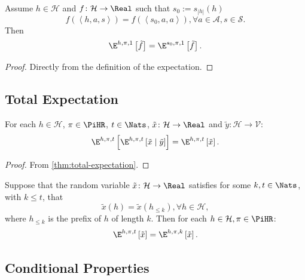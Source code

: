\begin{theorem} \label{thm:exph-horizon-trim}
Assume $h \in \mathcal{H}$ and $f \colon \mathcal{H} \to \Real$ such that $s_0 := s_{|h|}(h)$
\[
f(\left< h, a, s \right>) = f(\left< s_0, a, a \right>) , \forall a\in \mathcal{A}, s\in \mathcal{S}.
\]
Then
\[
\E^{h,\pi,1}\left[ \tilde{f} \right] =   
\E^{s_0,\pi,1}\left[ \tilde{f} \right].
\]
\end{theorem}
\begin{proof}
  Directly from the definition of the expectation.
\end{proof}

\subsection{Total Expectation}

\begin{theorem} \label{thm:total-expectation-h}
  For each $h\in \mathcal{H}$, $\pi\in \PiHR$, $t\in \Nats$, $\tilde{x}\colon \mathcal{H} \to \Real$ and $\tilde{y}\colon \mathcal{H} \to \mathcal{V}$:
  \[
    \E^{h, \pi, t} \left[ \E^{h, \pi, t} \left[  \tilde{x} \mid  \tilde{y} \right] \right]
    =
    \E^{h, \pi, t} \left[ \tilde{x} \right].
  \]
\end{theorem}
\begin{proof}
From \cref{thm:total-expectation}.
\end{proof}

\begin{theorem}\label{thm:exp-horizon-cut}
Suppose that the random variable $\tilde{x}\colon \mathcal{H} \to \Real$ satisfies for some $k, t \in \Nats$, with $k \le t$, that
  \[
   \tilde{x}(h) = \tilde{x}(h_{\le k}) , \forall h\in  \mathcal{H},
 \]
 where $h_{\le k}$ is the prefix of $h$ of length $k$. Then for each $h\in \mathcal{H}, \pi\in \PiHR$:
 \[
  \E^{h,\pi,t} \left[ \tilde{x} \right]  = \E^{h,\pi,k} \left[  \tilde{x} \right].
 \]
\end{theorem}


\subsection{Conditional Properties}

